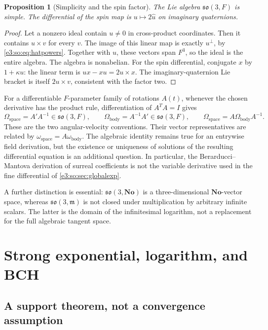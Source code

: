 \documentclass[11pt,letterpaper]{article}
\numberwithin{equation}{section}
\newtheorem{proposition}[proposition]{Proposition}
\theoremstyle{definition}
\theoremstyle{remark}
\newcommand{\No}{\mathbf{No}}
\newcommand{\mm}{\mathfrak m}
\newcommand{\so}{\mathfrak{so}}
\begin{document}
\begin{proposition}[Simplicity and the spin factor]\label{e3:so:prop:liesimple}
The Lie algebra \(\so(3,F)\) is simple. The differential of the spin map is
\(u\mapsto2\widehat u\) on imaginary quaternions.
\end{proposition}
\begin{proof}
Let a nonzero ideal contain \(u\ne0\) in cross-product coordinates. Then it
contains \(u\times v\) for every \(v\). The image of this linear map is exactly
\(u^\perp\), by \cref{e3:so:eq:hatpowers}. Together with \(u\), these vectors span
\(F^3\), so the ideal is the entire algebra. The algebra is nonabelian.
For the spin differential, conjugate \(x\) by \(1+\kappa u\): the linear term is
\(ux-xu=2u\times x\). The imaginary-quaternion Lie bracket is itself
\(2u\times v\), consistent with the factor two.
\end{proof}

For a differentiable \(F\)-parameter family of rotations \(A(t)\), whenever the
chosen derivative has the product rule, differentiation of \(A^TA=I\) gives
\[
 \Omega_{\mathrm{space}}=A'A^{-1}\in\so(3,F),\qquad
 \Omega_{\mathrm{body}}=A^{-1}A'\in\so(3,F),
 \qquad \Omega_{\mathrm{space}}=A\Omega_{\mathrm{body}}A^{-1}.
\]
These are the two angular-velocity conventions. Their vector representatives
are related by \(\omega_{\mathrm{space}}=A\omega_{\mathrm{body}}\).
The algebraic identity remains true for an entrywise field derivation, but the
existence or uniqueness of solutions of the resulting differential equation is
an additional question. In particular, the Berarducci--Mantova derivation of
surreal coefficients is not the variable derivative used in the fine
differential of \cref{e3:so:sec:globalexp}.

A further distinction is essential: \(\so(3,\No)\) is a three-dimensional
\(\No\)-vector space, whereas \(\so(3,\mm)\) is not closed under multiplication
by arbitrary infinite scalars. The latter is the domain of the infinitesimal
logarithm, not a replacement for the full algebraic tangent space.

\section{Strong exponential, logarithm, and BCH}\label{e3:so:sec:hahn}

\subsection{A support theorem, not a convergence assumption}
\end{document}
